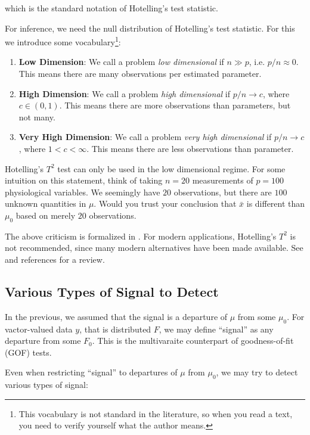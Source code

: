 \documentclass[]{book}
\providecommand{\tightlist}{%
  \setlength{\itemsep}{0pt}\setlength{\parskip}{0pt}}
\theoremstyle{definition}
\theoremstyle{definition}
\theoremstyle{definition}
\theoremstyle{remark}
\begin{document}
which is the standard notation of Hotelling's test statistic.

For inference, we need the null distribution of Hotelling's test
statistic. For this we introduce some vocabulary\footnote{This
  vocabulary is not standard in the literature, so when you read a text,
  you need to verify yourself what the author means.}:

\begin{enumerate}
\def\labelenumi{\arabic{enumi}.}
\tightlist
\item
  \textbf{Low Dimension}: We call a problem \emph{low dimensional} if
  \(n \gg p\), i.e. \(p/n \approx 0\). This means there are many
  observations per estimated parameter.
\item
  \textbf{High Dimension}: We call a problem \emph{high dimensional} if
  \(p/n \to c\), where \(c\in (0,1)\). This means there are more
  observations than parameters, but not many.
\item
  \textbf{Very High Dimension}: We call a problem \emph{very high
  dimensional} if \(p/n \to c\), where \(1<c<\infty\). This means there
  are less observations than parameter.
\end{enumerate}

Hotelling's \(T^2\) test can only be used in the low dimensional regime.
For some intuition on this statement, think of taking \(n=20\)
measurements of \(p=100\) physiological variables. We seemingly have
\(20\) observations, but there are \(100\) unknown quantities in
\(\mu\). Would you trust your conclusion that \(\bar x\) is different
than \(\mu_0\) based on merely \(20\) observations.

The above criticism is formalized in \citet{bai1996effect}. For modern
applications, Hotelling's \(T^2\) is not recommended, since many modern
alternatives have been made available. See \citet{rosenblatt2016better}
and references for a review.

\subsection{Various Types of Signal to
Detect}\label{various-types-of-signal-to-detect}

In the previous, we assumed that the signal is a departure of \(\mu\)
from some \(\mu_0\). For vactor-valued data \(y\), that is distributed
\(F\), we may define ``signal'' as any departure from some \(F_0\). This
is the multivaraite counterpart of goodness-of-fit (GOF) tests.

Even when restricting ``signal'' to departures of \(\mu\) from
\(\mu_0\), we may try to detect various types of signal:
\end{document}
